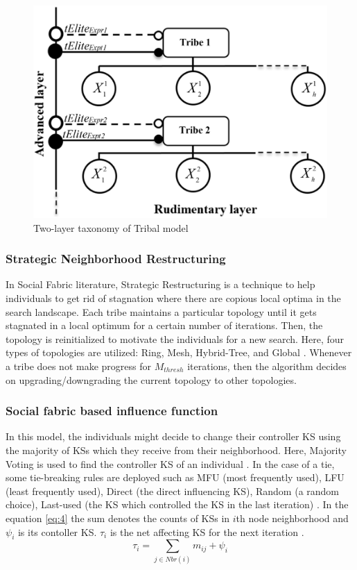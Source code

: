 \documentclass{llncs}
\begin{document}
\begin{figure}[h]
	\includegraphics[scale=0.21]{twoLayer}
	\centering
	\caption{Two-layer taxonomy of Tribal model \cite{ali2016leveraged}}
	\label{ref:twoLayer}
\end{figure}
\subsubsection{Strategic Neighborhood Restructuring}
In  Social Fabric literature, Strategic Restructuring is a technique to help individuals to get rid of stagnation where there are copious local optima in the search landscape. Each tribe maintains a particular topology until it gets stagnated in a local optimum for a certain number of iterations. Then, the topology is reinitialized to motivate the individuals for a new search. Here, four types of topologies are utilized: Ring, Mesh, Hybrid-Tree, and Global \cite{ali2012socio} \cite{ali2016leveraged}. Whenever a tribe does not make progress for $M_{thresh}$ iterations, then the algorithm decides on upgrading/downgrading the current topology to other topologies. \newline
\subsubsection{Social fabric based influence function} In this model, the individuals might decide to change their controller KS using the majority of KSs which they receive from their neighborhood. Here, Majority Voting is used to find the controller KS of an individual \cite{che2010robust}. In the case of a tie, some tie-breaking rules are deployed such as MFU (most frequently used), LFU (least frequently used), Direct (the direct influencing KS), Random (a random choice), Last-used (the KS which controlled the KS in the last iteration) \cite{ali2012socio}. In the equation \ref{eq:4} the sum denotes the counts of KSs in $i$th node neighborhood and $\psi_{i}$ is its contoller KS. $\tau_{i}$ is the net affecting KS for the next iteration \cite{ali2016leveraged} \cite{sterling2004aggregation}. 
\begin{equation}
	\label{eq:4}
	\tau_{i}=\sum_{j \in Nbr(i)}m_{ij} + \psi_{i}
\end{equation}
\end{document}
